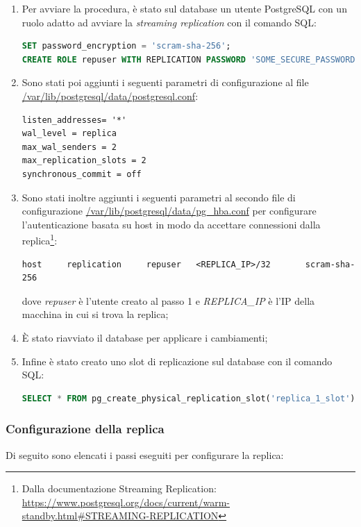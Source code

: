 \begin{enumerate}
  \item Per avviare la procedura, è stato sul database un utente PostgreSQL con un ruolo adatto ad avviare la \textit{streaming replication} con il comando SQL:
  \vspace{1mm}
   \begin{lstlisting}[language=sql]
SET password_encryption = 'scram-sha-256'; 
CREATE ROLE repuser WITH REPLICATION PASSWORD 'SOME_SECURE_PASSWORD' LOGIN;\end{lstlisting}
  \item Sono stati poi aggiunti i seguenti parametri di configurazione al file \url{/var/lib/postgresql/data/postgresql.conf}:
  \vspace{1mm}
  \begin{lstlisting}[]
listen_addresses= '*'
wal_level = replica
max_wal_senders = 2
max_replication_slots = 2
synchronous_commit = off
\end{lstlisting}

  \item Sono stati inoltre aggiunti i seguenti parametri al secondo file di configurazione \url{/var/lib/postgresql/data/pg_hba.conf} per configurare l'autenticazione basata su host in modo da accettare connessioni dalla replica\footnote{Dalla documentazione Streaming Replication: \url{https://www.postgresql.org/docs/current/warm-standby.html\#STREAMING-REPLICATION}}:
  \vspace{1mm}
\begin{lstlisting}[]
host     replication     repuser   <REPLICA_IP>/32       scram-sha-256
\end{lstlisting}
dove \textit{repuser} è l'utente creato al passo 1 e \textit{REPLICA\_IP} è l'IP della macchina in cui si trova la replica;
  \item È stato riavviato il database per applicare i cambiamenti;
  \item Infine è stato creato uno slot di replicazione sul database con il comando SQL:
  \vspace{1mm}
  \begin{lstlisting}[language=sql]
SELECT * FROM pg_create_physical_replication_slot('replica_1_slot');
\end{lstlisting}
\end{enumerate}

\subsubsection{Configurazione della replica}
Di seguito sono elencati i passi eseguiti per configurare la replica:

